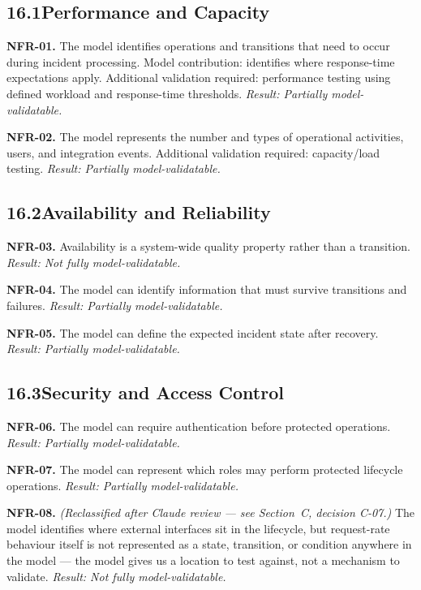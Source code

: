 \documentclass[11pt,a4paper]{article}
\begin{document}
\subsection*{16.1\enspace Performance and Capacity}

\textbf{NFR-01.} The model identifies operations and transitions that need to occur during incident processing. Model contribution: identifies where response-time expectations apply. Additional validation required: performance testing using defined workload and response-time thresholds. \textit{Result: Partially model-validatable.}

\textbf{NFR-02.} The model represents the number and types of operational activities, users, and integration events. Additional validation required: capacity/load testing. \textit{Result: Partially model-validatable.}

\subsection*{16.2\enspace Availability and Reliability}

\textbf{NFR-03.} Availability is a system-wide quality property rather than a transition. \textit{Result: Not fully model-validatable.}

\textbf{NFR-04.} The model can identify information that must survive transitions and failures. \textit{Result: Partially model-validatable.}

\textbf{NFR-05.} The model can define the expected incident state after recovery. \textit{Result: Partially model-validatable.}

\subsection*{16.3\enspace Security and Access Control}

\textbf{NFR-06.} The model can require authentication before protected operations. \textit{Result: Partially model-validatable.}

\textbf{NFR-07.} The model can represent which roles may perform protected lifecycle operations. \textit{Result: Partially model-validatable.}

\textbf{NFR-08.} \textit{(Reclassified after Claude review — see Section~C, decision C-07.)} The model identifies where external interfaces sit in the lifecycle, but request-rate behaviour itself is not represented as a state, transition, or condition anywhere in the model — the model gives us a location to test against, not a mechanism to validate. \textit{Result: Not fully model-validatable.}
\end{document}
